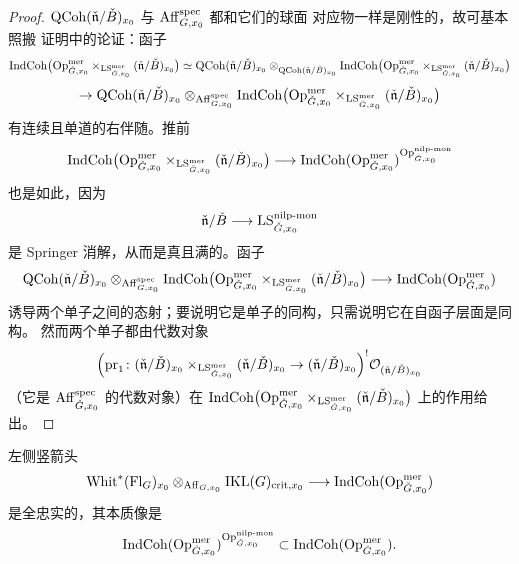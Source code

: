 \begin{proof}
$\mathrm{QCoh}(\check{\mathfrak{n}}/\check B)_{x_0}$ 与 $\mathrm{Aff}^{\mathrm{spec}}_{G,x_0}$ 都和它们的球面
对应物一样是刚性的，故可基本照搬 \cite[命题 3.6.5]{ABC+24a} 证明中的论证：函子
\begin{equation}
\mathrm{IndCoh}\bigl(\mathrm{Op}^{\mathrm{mer}}_{\check G,x_0}
\times_{\mathrm{LS}^{\mathrm{mer}}_{\check G,x_0}}(\check{\mathfrak{n}}/\check B)_{x_0}\bigr)
\simeq \mathrm{QCoh}(\check{\mathfrak{n}}/\check B)_{x_0}
\otimes_{\mathrm{QCoh}(\check{\mathfrak{n}}/\check B)_{x_0}}
\mathrm{IndCoh}\bigl(\mathrm{Op}^{\mathrm{mer}}_{\check G,x_0}
\times_{\mathrm{LS}^{\mathrm{mer}}_{\check G,x_0}}(\check{\mathfrak{n}}/\check B)_{x_0}\bigr)
\label{eq:3.4.7}
\end{equation}
\begin{equation}
\to \mathrm{QCoh}(\check{\mathfrak{n}}/\check B)_{x_0}
\otimes_{\mathrm{Aff}^{\mathrm{spec}}_{G,x_0}}
\mathrm{IndCoh}\bigl(\mathrm{Op}^{\mathrm{mer}}_{\check G,x_0}
\times_{\mathrm{LS}^{\mathrm{mer}}_{\check G,x_0}}(\check{\mathfrak{n}}/\check B)_{x_0}\bigr)
\label{eq:3.4.8}
\end{equation}
有连续且单道的右伴随。推前
\[
\mathrm{IndCoh}\bigl(\mathrm{Op}^{\mathrm{mer}}_{\check G,x_0}
\times_{\mathrm{LS}^{\mathrm{mer}}_{\check G,x_0}}(\check{\mathfrak{n}}/\check B)_{x_0}\bigr)
\longrightarrow
\mathrm{IndCoh}(\mathrm{Op}^{\mathrm{mer}}_{\check G,x_0})^{\mathrm{Op}^{\mathrm{nilp\text{-}mon}}_{\check G,x_0}}
\]
也是如此，因为
\[
\check{\mathfrak{n}}/\check B\longrightarrow \mathrm{LS}^{\mathrm{nilp\text{-}mon}}_{\check G,x_0}
\]
是 Springer 消解，从而是真且满的。函子
\[
\mathrm{QCoh}(\check{\mathfrak{n}}/\check B)_{x_0}
\otimes_{\mathrm{Aff}^{\mathrm{spec}}_{G,x_0}}
\mathrm{IndCoh}\bigl(\mathrm{Op}^{\mathrm{mer}}_{\check G,x_0}
\times_{\mathrm{LS}^{\mathrm{mer}}_{\check G,x_0}}(\check{\mathfrak{n}}/\check B)_{x_0}\bigr)
\longrightarrow \mathrm{IndCoh}(\mathrm{Op}^{\mathrm{mer}}_{\check G,x_0})
\]
诱导两个单子之间的态射；要说明它是单子的同构，只需说明它在自函子层面是同构。
然而两个单子都由代数对象
\[
\Bigl(\mathrm{pr}_1\colon (\check{\mathfrak{n}}/\check B)_{x_0}
\times_{\mathrm{LS}^{\mathrm{mer}}_{\check G,x_0}}(\check{\mathfrak{n}}/\check B)_{x_0}
\to (\check{\mathfrak{n}}/\check B)_{x_0}\Bigr)^{!}
\mathcal{O}_{(\check{\mathfrak{n}}/\check B)_{x_0}}
\]
（它是 $\mathrm{Aff}^{\mathrm{spec}}_{\check G,x_0}$ 的代数对象）在
$\mathrm{IndCoh}\bigl(\mathrm{Op}^{\mathrm{mer}}_{\check G,x_0}
\times_{\mathrm{LS}^{\mathrm{mer}}_{\check G,x_0}}(\check{\mathfrak{n}}/\check B)_{x_0}\bigr)$
上的作用给出。
\end{proof}

\begin{proposition}\label{prop:3.4.4.3}
左侧竖箭头
\[
\mathrm{Whit}^{*}(\mathrm{Fl}_G)_{x_0}\otimes_{\mathrm{Aff}_{G,x_0}}\mathrm{IKL}(G)_{\mathrm{crit},x_0}
\longrightarrow \mathrm{IndCoh}(\mathrm{Op}^{\mathrm{mer}}_{\check G,x_0})
\]
是全忠实的，其本质像是
\[
\mathrm{IndCoh}(\mathrm{Op}^{\mathrm{mer}}_{\check G,x_0})^{\mathrm{Op}^{\mathrm{nilp\text{-}mon}}_{\check G,x_0}}
\subset \mathrm{IndCoh}(\mathrm{Op}^{\mathrm{mer}}_{\check G,x_0}).
\]
\end{proposition}


